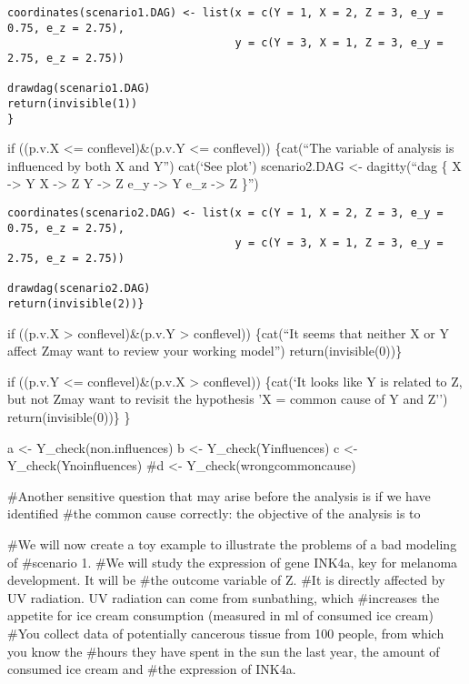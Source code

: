 \documentclass[
]{article}
\begin{document}
\begin{verbatim}
coordinates(scenario1.DAG) <- list(x = c(Y = 1, X = 2, Z = 3, e_y = 0.75, e_z = 2.75),
                                   y = c(Y = 3, X = 1, Z = 3, e_y = 2.75, e_z = 2.75))

drawdag(scenario1.DAG)
return(invisible(1))
}
\end{verbatim}

if ((p.v.X \textless= conflevel)\&(p.v.Y \textless= conflevel))
\{cat(``The variable of analysis is influenced by both X and Y\n'')
cat(`See plot\n') scenario2.DAG \textless- dagitty(``dag \{ X
-\textgreater{} Y X -\textgreater{} Z Y -\textgreater{} Z e\_y
-\textgreater{} Y e\_z -\textgreater{} Z \}'')

\begin{verbatim}
coordinates(scenario2.DAG) <- list(x = c(Y = 1, X = 2, Z = 3, e_y = 0.75, e_z = 2.75),
                                   y = c(Y = 3, X = 1, Z = 3, e_y = 2.75, e_z = 2.75))

drawdag(scenario2.DAG)
return(invisible(2))}
\end{verbatim}

if ((p.v.X \textgreater{} conflevel)\&(p.v.Y \textgreater{} conflevel))
\{cat(``It seems that neither X or Y affect Z\nYou may want to review
your working model\n'') return(invisible(0))\}

if ((p.v.Y \textless= conflevel)\&(p.v.X \textgreater{} conflevel))
\{cat(`It looks like Y is related to Z, but not Z\nYou may want to
revisit the hypothesis 'X = common cause of Y and Z'')
return(invisible(0))\} \}

a \textless- Y\_check(non.influences) b \textless- Y\_check(Yinfluences)
c \textless- Y\_check(Ynoinfluences) \#d \textless-
Y\_check(wrongcommoncause)

\#Another sensitive question that may arise before the analysis is if we
have identified \#the common cause correctly: the objective of the
analysis is to

\#We will now create a toy example to illustrate the problems of a bad
modeling of \#scenario 1. \#We will study the expression of gene INK4a,
key for melanoma development. It will be \#the outcome variable of Z.
\#It is directly affected by UV radiation. UV radiation can come from
sunbathing, which \#increases the appetite for ice cream consumption
(measured in ml of consumed ice cream) \#You collect data of potentially
cancerous tissue from 100 people, from which you know the \#hours they
have spent in the sun the last year, the amount of consumed ice cream
and \#the expression of INK4a.
\end{document}
